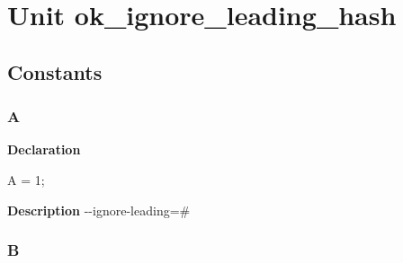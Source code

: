 \documentclass{report}
\newif\ifpdf
\begin{document}
\label{toc}\tableofcontents
\newpage
\newlength{\tmplength}
\chapter{Unit ok{\_}ignore{\_}leading{\_}hash}
\label{ok_ignore_leading_hash}
\section{Constants}
\ifpdf
\subsection*{\large{\textbf{A}}\normalsize\hspace{1ex}\hrulefill}
\else
\subsection*{A}
\fi
\label{ok_ignore_leading_hash-A}
\begin{list}{}{
\setlength{\itemindent}{0cm}
\setlength{\listparindent}{0cm}
\setlength{\leftmargin}{\evensidemargin}
\addtolength{\leftmargin}{\tmplength}
\settowidth{\labelsep}{X}
\addtolength{\leftmargin}{\labelsep}
\setlength{\labelwidth}{\tmplength}
}
\item[\textbf{Declaration}\hfill]
\ifpdf
\begin{flushleft}
\fi
\begin{ttfamily}
A = 1;\end{ttfamily}

\ifpdf
\end{flushleft}
\fi

\par
\item[\textbf{Description}]
{-}{-}ignore{-}leading={\#}

\end{list}
\ifpdf
\subsection*{\large{\textbf{B}}\normalsize\hspace{1ex}\hrulefill}
\else
\end{document}
